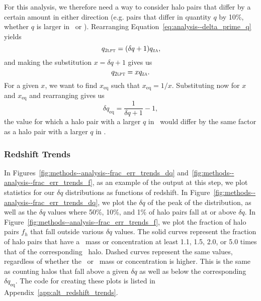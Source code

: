 For this analysis, we therefore need a way to consider halo pairs that differ by a certain amount in either direction (e.g. pairs that differ in quantity $q$ by 10\%, whether $q$ is larger in \lpt\ or \za).  Rearranging Equation~\ref{eq:analysis--delta_prime_q} yields
\begin{equation}
	q_{\textsc{2lpt}} = (\delta q + 1) q_{\textsc{za}},
\end{equation}
and making the substitution $x = \delta q + 1$ gives us
\begin{equation}
	q_{\textsc{2lpt}} = x q_{\textsc{za}}.
\end{equation}
For a given $x$, we want to find $x_{\mathrm{eq}}$ such that $x_{\mathrm{eq}} = 1 / x$.  Substituting now for $x$ and $x_{\mathrm{eq}}$ and rearranging gives us
\begin{equation} \label{eq:analysis--equivalent_q_prime}
	\delta q_{\mathrm{eq}} = \frac{1}{\delta q + 1} - 1,
\end{equation}
the value for which a halo pair with a larger $q$ in \za\ would differ by the same factor as a halo pair with a larger $q$ in \lpt.



\subsubsection{Redshift Trends}
\label{subsubsec:analysis--alt_diff_dist--trends}


In Figures~\ref{fig:methods--analysis--frac_err_trends_dq} and~\ref{fig:methods--analysis--frac_err_trends_f}, as an example of the output at this step, we plot statistics for our $\delta q$ distributions as functions of redshift.  In Figure~\ref{fig:methods--analysis--frac_err_trends_dq}, we plot the $\delta q$ of the peak of the distribution, as well as the $\delta q$ values where 50\%, 10\%, and 1\% of halo pairs fall at or above $\delta q$.  In Figure~\ref{fig:methods--analysis--frac_err_trends_f}, we plot the fraction of halo pairs $f_{h}$ that fall outside various $\delta q$ values.  The solid curves represent the fraction of halo pairs that have a \lpt\ mass or concentration at least 1.1, 1.5, 2.0, or 5.0 times that of the corresponding \za\ halo.  Dashed curves represent the same values, regardless of whether the \lpt\ or \za\ mass or concentration is higher.  This is the same as counting halos that fall above a given $\delta q$ as well as below the corresponding $\delta q_{\mathrm{eq}}$.  The code for creating these plots is listed in Appendix~\ref{app:alt_redshift_trends}.

